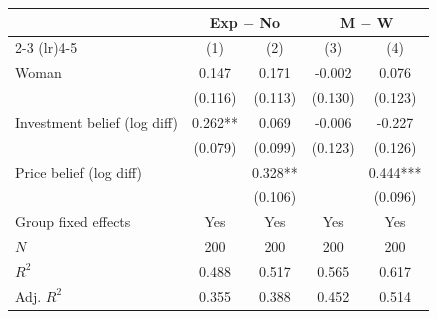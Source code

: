   \begin{tabular}{l*{4}{c}}
    \toprule
     & \multicolumn{2}{c}{Exp $-$ No} & \multicolumn{2}{c}{ M $-$ W} \\
    \cmidrule(lr){2-3} \cmidrule(lr){4-5}
     & (1) & (2) & (3) & (4) \\
    \midrule
Woman & 0.147 & 0.171 & -0.002 & 0.076 \\
 & (0.116) & (0.113) & (0.130) & (0.123) \\
Investment belief (log diff) & 0.262** & 0.069 & -0.006 & -0.227 \\
 & (0.079) & (0.099) & (0.123) & (0.126) \\
Price belief (log diff) &  & 0.328** &  & 0.444*** \\
 &  & (0.106) &  & (0.096) \\
    \midrule
    Group fixed effects & Yes & Yes & Yes & Yes \\
    $N$ & 200 & 200 & 200 & 200 \\
    $R^2$ & 0.488 & 0.517 & 0.565 & 0.617 \\
    Adj. $R^2$ & 0.355 & 0.388 & 0.452 & 0.514 \\
    \bottomrule
  \end{tabular}
